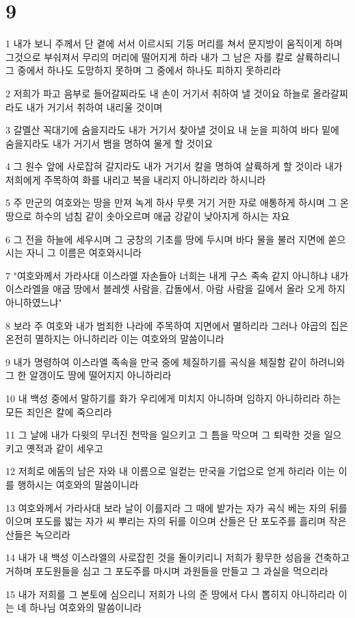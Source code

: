 \chapter{9}

\par 1 내가 보니 주께서 단 곁에 서서 이르시되 기둥 머리를 쳐서 문지방이 움직이게 하며 그것으로 부숴져서 무리의 머리에 떨어지게 하라 내가 그 남은 자를 칼로 살륙하리니 그 중에서 하나도 도망하지 못하며 그 중에서 하나도 피하지 못하리라
\par 2 저희가 파고 음부로 들어갈찌라도 내 손이 거기서 취하여 낼 것이요 하늘로 올라갈찌라도 내가 거기서 취하여 내리울 것이며
\par 3 갈멜산 꼭대기에 숨을지라도 내가 거기서 찾아낼 것이요 내 눈을 피하여 바다 밑에 숨을지라도 내가 거기서 뱀을 명하여 물게 할 것이요
\par 4 그 원수 앞에 사로잡혀 갈지라도 내가 거기서 칼을 명하여 살륙하게 할 것이라 내가 저희에게 주목하여 화를 내리고 복을 내리지 아니하리라 하시니라
\par 5 주 만군의 여호와는 땅을 만져 녹게 하사 무릇 거기 거한 자로 애통하게 하시며 그 온 땅으로 하수의 넘침 같이 솟아오르며 애굽 강같이 낮아지게 하시는 자요
\par 6 그 전을 하늘에 세우시며 그 궁창의 기초를 땅에 두시며 바다 물을 불러 지면에 쏟으시는 자니 그 이름은 여호와시니라
\par 7 "여호와께서 가라사대 이스라엘 자손들아 너희는 내게 구스 족속 같지 아니하냐 내가 이스라엘을 애굽 땅에서 블레셋 사람을, 갑돌에서, 아람 사람을 길에서 올라 오게 하지 아니하였느냐"
\par 8 보라 주 여호와 내가 범죄한 나라에 주목하여 지면에서 멸하리라 그러나 야곱의 집은 온전히 멸하지는 아니하리라 이는 여호와의 말씀이니라
\par 9 내가 명령하여 이스라엘 족속을 만국 중에 체질하기를 곡식을 체질함 같이 하려니와 그 한 알갱이도 땅에 떨어지지 아니하리라
\par 10 내 백성 중에서 말하기를 화가 우리에게 미치지 아니하며 임하지 아니하리라 하는 모든 죄인은 칼에 죽으리라
\par 11 그 날에 내가 다윗의 무너진 천막을 일으키고 그 틈을 막으며 그 퇴락한 것을 일으키고 옛적과 같이 세우고
\par 12 저희로 에돔의 남은 자와 내 이름으로 일컫는 만국을 기업으로 얻게 하리라 이는 이를 행하시는 여호와의 말씀이니라
\par 13 여호와께서 가라사대 보라 날이 이를지라 그 때에 밭가는 자가 곡식 베는 자의 뒤를 이으며 포도를 밟는 자가 씨 뿌리는 자의 뒤를 이으며 산들은 단 포도주를 흘리며 작은 산들은 녹으리라
\par 14 내가 내 백성 이스라엘의 사로잡힌 것을 돌이키리니 저희가 황무한 성읍을 건축하고 거하며 포도원들을 심고 그 포도주를 마시며 과원들을 만들고 그 과실을 먹으리라
\par 15 내가 저희를 그 본토에 심으리니 저희가 나의 준 땅에서 다시 뽑히지 아니하리라 이는 네 하나님 여호와의 말씀이니라


